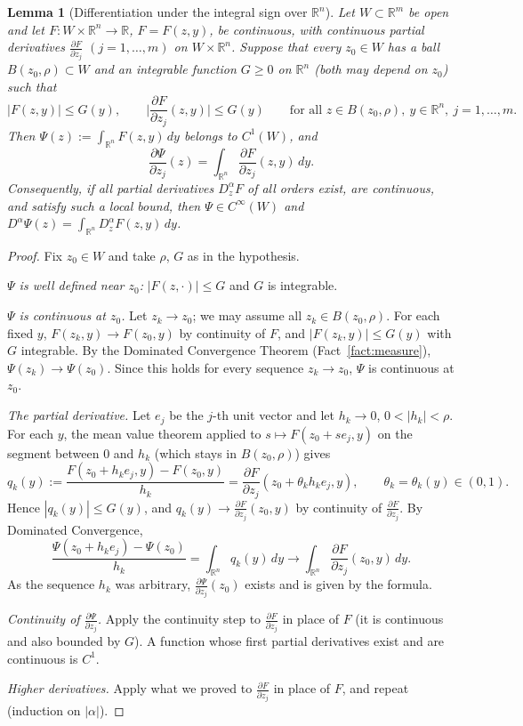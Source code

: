 \documentclass[11pt]{article}
\theoremstyle{plain}
\newtheorem{lemma}[theorem]{Lemma}
\theoremstyle{definition}
\theoremstyle{remark}
\begin{document}
\begin{lemma}[Differentiation under the integral sign over $\mathbb{R}^n$]\label{lem:diffintRn}
Let $W \subset \mathbb{R}^m$ be open and let $F : W \times \mathbb{R}^n \to \mathbb{R}$, $F = F(z,y)$, be continuous, with continuous partial derivatives $\frac{\partial F}{\partial z_j}$ $(j = 1,\dots,m)$ on $W \times \mathbb{R}^n$. Suppose that every $z_0 \in W$ has a ball $B(z_0,\rho) \subset W$ and an integrable function $G \geq 0$ on $\mathbb{R}^n$ (both may depend on $z_0$) such that
$$ |F(z,y)| \leq G(y), \qquad \Big|\frac{\partial F}{\partial z_j}(z,y)\Big| \leq G(y) \qquad \text{for all } z \in B(z_0,\rho),\ y \in \mathbb{R}^n,\ j = 1,\dots,m. $$
Then $\Psi(z) := \int_{\mathbb{R}^n} F(z,y)\, dy$ belongs to $C^1(W)$, and
$$ \frac{\partial \Psi}{\partial z_j}(z) = \int_{\mathbb{R}^n}\frac{\partial F}{\partial z_j}(z,y)\, dy. $$
Consequently, if all partial derivatives $D^\alpha_z F$ of all orders exist, are continuous, and satisfy such a local bound, then $\Psi \in C^\infty(W)$ and $D^\alpha\Psi(z) = \int_{\mathbb{R}^n} D^\alpha_z F(z,y)\, dy$.
\end{lemma}
\begin{proof}
Fix $z_0 \in W$ and take $\rho$, $G$ as in the hypothesis.

\emph{$\Psi$ is well defined near $z_0$:} $|F(z,\cdot)| \leq G$ and $G$ is integrable.

\emph{$\Psi$ is continuous at $z_0$.} Let $z_k \to z_0$; we may assume all $z_k \in B(z_0,\rho)$. For each fixed $y$, $F(z_k,y) \to F(z_0,y)$ by continuity of $F$, and $|F(z_k,y)| \leq G(y)$ with $G$ integrable. By the Dominated Convergence Theorem (Fact~\ref{fact:measure}), $\Psi(z_k) \to \Psi(z_0)$. Since this holds for every sequence $z_k \to z_0$, $\Psi$ is continuous at $z_0$.

\emph{The partial derivative.} Let $e_j$ be the $j$-th unit vector and let $h_k \to 0$, $0 < |h_k| < \rho$. For each $y$, the mean value theorem applied to $s \mapsto F(z_0 + s e_j, y)$ on the segment between $0$ and $h_k$ (which stays in $B(z_0,\rho)$) gives
$$ q_k(y) := \frac{F(z_0 + h_k e_j, y) - F(z_0,y)}{h_k} = \frac{\partial F}{\partial z_j}(z_0 + \theta_k h_k e_j, y), \qquad \theta_k = \theta_k(y) \in (0,1). $$
Hence $|q_k(y)| \leq G(y)$, and $q_k(y) \to \frac{\partial F}{\partial z_j}(z_0,y)$ by continuity of $\frac{\partial F}{\partial z_j}$. By Dominated Convergence,
$$ \frac{\Psi(z_0 + h_k e_j) - \Psi(z_0)}{h_k} = \int_{\mathbb{R}^n} q_k(y)\, dy \to \int_{\mathbb{R}^n}\frac{\partial F}{\partial z_j}(z_0,y)\, dy. $$
As the sequence $h_k$ was arbitrary, $\frac{\partial\Psi}{\partial z_j}(z_0)$ exists and is given by the formula.

\emph{Continuity of $\frac{\partial\Psi}{\partial z_j}$.} Apply the continuity step to $\frac{\partial F}{\partial z_j}$ in place of $F$ (it is continuous and also bounded by $G$). A function whose first partial derivatives exist and are continuous is $C^1$.

\emph{Higher derivatives.} Apply what we proved to $\frac{\partial F}{\partial z_j}$ in place of $F$, and repeat (induction on $|\alpha|$).
\end{proof}
\end{document}
